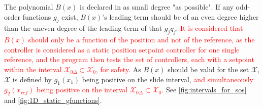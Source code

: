 %
%
The polynomial $B(x)$ is declared in as small degree "as possible". If any odd-order functions $g_j$ exist, $B(x)$'s leading term should be of an even degree higher than the uneven degree of the leading term of that $g_jq_j$. \textcolor{red}{It is considered that $B(x)$ should only be a function of the position and not of the reference, as the controller is considered as a static position setpoint controller for one single reference, and the program then tests the set of controllers, each with a setpoint within the interval $\mathcal{X}_{0\Delta} \subset \mathcal{X}_0$, for safety.}
As $B(x)$ should be valid for the set $\mathcal{X}$, $\mathcal{X}$ is defined by $g_1(x_1)$ being positive on the slide interval, \textcolor{red}{and simultaneously $g_2(x_{ref})$ being positive on the interval $\mathcal{X}_{0\Delta} \subset \mathcal{X}_0$.} See \autoref{fig:intervals_for_sos} and \ref{fig:1D_static_gfunctions}.


